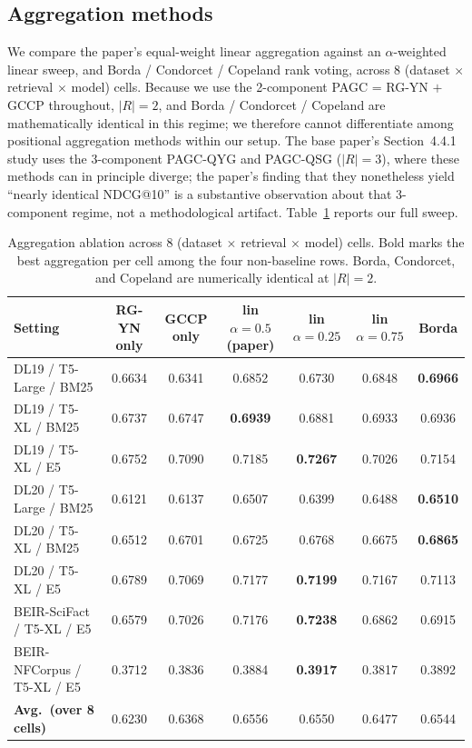\documentclass[sigconf]{acmart}
\begin{document}
\subsection{Aggregation methods}
\label{sec:agg}
We compare the paper's equal-weight linear aggregation against an
$\alpha$-weighted linear sweep, and Borda / Condorcet / Copeland
rank voting, across 8 (dataset $\times$ retrieval $\times$ model)
cells. Because we use the 2-component PAGC = RG-YN $+$ GCCP
throughout, $|R|=2$, and Borda / Condorcet / Copeland are
mathematically identical in this regime; we therefore cannot
differentiate among positional aggregation methods within our
setup. The base paper's Section~4.4.1 study uses the 3-component
PAGC-QYG and PAGC-QSG ($|R|=3$), where these methods can in
principle diverge; the paper's finding that they nonetheless
yield ``nearly identical NDCG@10'' is a substantive observation
about that 3-component regime, not a methodological artifact.
Table~\ref{tab:agg} reports our full sweep.

\begin{table}[t]
\centering
\small
\begin{tabular}{lcccccc}
\toprule
\textbf{Setting} & RG-YN only & GCCP only & lin $\alpha{=}0.5$ (paper) & lin $\alpha{=}0.25$ & lin $\alpha{=}0.75$ & Borda \\
\midrule
DL19 / T5-Large / BM25       & 0.6634 & 0.6341 & 0.6852 & 0.6730 & 0.6848 & \textbf{0.6966} \\
DL19 / T5-XL    / BM25       & 0.6737 & 0.6747 & \textbf{0.6939} & 0.6881 & 0.6933 & 0.6936 \\
DL19 / T5-XL    / E5         & 0.6752 & 0.7090 & 0.7185 & \textbf{0.7267} & 0.7026 & 0.7154 \\
DL20 / T5-Large / BM25       & 0.6121 & 0.6137 & 0.6507 & 0.6399 & 0.6488 & \textbf{0.6510} \\
DL20 / T5-XL    / BM25       & 0.6512 & 0.6701 & 0.6725 & 0.6768 & 0.6675 & \textbf{0.6865} \\
DL20 / T5-XL    / E5         & 0.6789 & 0.7069 & 0.7177 & \textbf{0.7199} & 0.7167 & 0.7113 \\
BEIR-SciFact  / T5-XL / E5   & 0.6579 & 0.7026 & 0.7176 & \textbf{0.7238} & 0.6862 & 0.6915 \\
BEIR-NFCorpus / T5-XL / E5   & 0.3712 & 0.3836 & 0.3884 & \textbf{0.3917} & 0.3817 & 0.3892 \\
\midrule
\textbf{Avg.\ (over 8 cells)} & 0.6230 & 0.6368 & 0.6556 & 0.6550 & 0.6477 & 0.6544 \\
\bottomrule
\end{tabular}
\caption{Aggregation ablation across 8 (dataset $\times$ retrieval $\times$ model)
cells. Bold marks the best aggregation per cell among the four
non-baseline rows. Borda, Condorcet, and Copeland are numerically
identical at $|R|=2$.}
\label{tab:agg}
\end{table}
\end{document}
